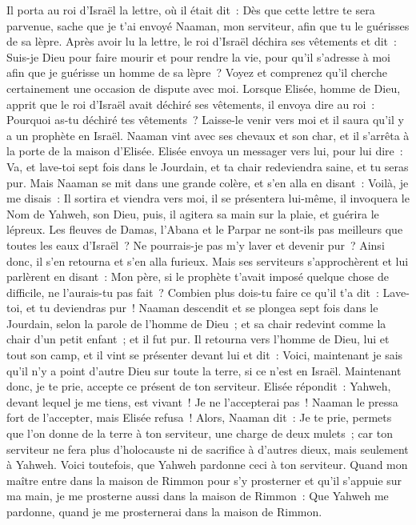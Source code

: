 \begin{multicols}{2}
Il porta au roi d'Israël la lettre, où il était dit~: Dès que cette lettre te sera parvenue, sache que je t'ai envoyé Naaman, mon serviteur, afin que tu le guérisses de sa lèpre.
Après avoir lu la lettre, le roi d'Israël déchira ses vêtements et dit~: Suis-je Dieu pour faire mourir et pour rendre la vie, pour qu'il s'adresse à moi afin que je guérisse un homme de sa lèpre~? Voyez et comprenez qu'il cherche certainement une occasion de dispute avec moi.
Lorsque Elisée, homme de Dieu, apprit que le roi d'Israël avait déchiré ses vêtements, il envoya dire au roi~: Pourquoi as-tu déchiré tes vêtements~? Laisse-le venir vers moi et il saura qu'il y a un prophète en Israël.
Naaman vint avec ses chevaux et son char, et il s'arrêta à la porte de la maison d'Elisée.
Elisée envoya un messager vers lui, pour lui dire~: Va, et lave-toi sept fois dans le Jourdain, et ta chair redeviendra saine, et tu seras pur.
Mais Naaman se mit dans une grande colère, et s'en alla en disant~: Voilà, je me disais~: Il sortira et viendra vers moi, il se présentera lui-même, il invoquera le Nom de Yahweh, son Dieu, puis, il agitera sa main sur la plaie, et guérira le lépreux.
Les fleuves de Damas, l'Abana et le Parpar ne sont-ils pas meilleurs que toutes les eaux d'Israël~? Ne pourrais-je pas m'y laver et devenir pur~? Ainsi donc, il s'en retourna et s'en alla furieux.
Mais ses serviteurs s'approchèrent et lui parlèrent en disant~: Mon père, si le prophète t'avait imposé quelque chose de difficile, ne l'aurais-tu pas fait~? Combien plus dois-tu faire ce qu'il t'a dit~: Lave-toi, et tu deviendras pur~!
Naaman descendit et se plongea sept fois dans le Jourdain, selon la parole de l'homme de Dieu~; et sa chair redevint comme la chair d'un petit enfant~; et il fut pur.
Il retourna vers l'homme de Dieu, lui et tout son camp, et il vint se présenter devant lui et dit~: Voici, maintenant je sais qu'il n'y a point d'autre Dieu sur toute la terre, si ce n'est en Israël. Maintenant donc, je te prie, accepte ce présent de ton serviteur.
Elisée répondit~: Yahweh, devant lequel je me tiens, est vivant~! Je ne l'accepterai pas~! Naaman le pressa fort de l'accepter, mais Elisée refusa~!
Alors, Naaman dit~: Je te prie, permets que l'on donne de la terre à ton serviteur, une charge de deux mulets~; car ton serviteur ne fera plus d'holocauste ni de sacrifice à d'autres dieux, mais seulement à Yahweh.
Voici toutefois, que Yahweh pardonne ceci à ton serviteur. Quand mon maître entre dans la maison de Rimmon pour s'y prosterner et qu'il s'appuie sur ma main, je me prosterne aussi dans la maison de Rimmon~: Que Yahweh me pardonne, quand je me prosternerai dans la maison de Rimmon.

\end{multicols}
